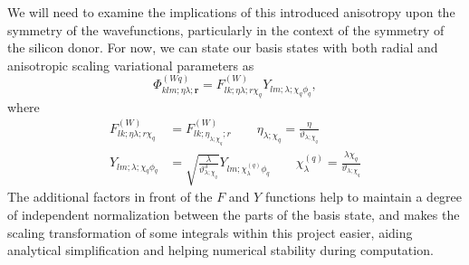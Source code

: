 We will need to examine the implications of this introduced anisotropy upon the
symmetry of the wavefunctions, particularly in the context of the symmetry of
the silicon donor. For now, we can state our basis states with both radial and
anisotropic scaling variational parameters as
\begin{equation}
  \Phi_{klm;\eta\lambda;\bm{r}}^{(Wq)}
  =
  F_{lk;\eta\lambda;r\chi_{q}}^{\left(W\right)}
  Y_{lm;\lambda;\chi_{q}\phi_{q}},
  \label{scaled_wf}
\end{equation}
where
\begin{align}
  F_{lk;\eta\lambda;r\chi_{q}}^{\left(W\right)}
  & = 
  F_{lk;\eta_{\lambda;\chi_{q}};r}^{\left(W\right)}
  \quad\quad
  \eta_{\lambda;\chi_{q}}
  =
  \frac{\eta}{\vartheta_{\lambda;\chi_{q}}}
  \label{scaled_wf:radial_part}
  \\
  Y_{lm;\lambda;\chi_{q}\phi_{q}}
  & =
  \sqrt{ \frac{\lambda}{\vartheta_{\lambda;\chi_{q}}^{3}} }
  Y_{
    lm;
    \chi_{\lambda}^{\left(q\right)}
    \phi_{q}
  }
  \quad\quad
  \chi_{\lambda}^{\left(q\right)}
  =
  \frac{\lambda\chi_{q}}{\vartheta_{\lambda;\chi_{q}}}
  \label{scaled_wf:aniso_part}
\end{align}
The additional factors in front of the $F$ and $Y$ functions help to maintain a
degree of independent normalization between the parts of the basis state, and
makes the scaling transformation of some integrals within this project easier,
aiding analytical simplification and helping numerical stability during
computation.